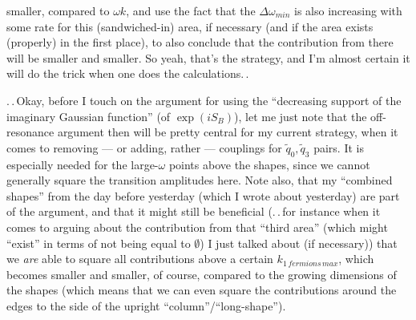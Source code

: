 \documentclass{report}
\begin{document}
smaller, compared to $\omega k$, and use the fact that the $\Delta\omega_{min}$ is also increasing with some rate for this (sandwiched-in) area, if necessary (and if the area exists (properly) in the first place), to also conclude that the contribution from there will be smaller and smaller. So yeah, that's the strategy, and I'm almost certain it will do the trick when one does the calculations.\,. 

.\,.\,Okay, before I touch on the argument for using the ``decreasing support of the imaginary Gaussian function'' (of $\exp(i S_B)$), let me just note that the off-resonance argument then will be pretty central for my current strategy, when it comes to removing --- or adding, rather --- couplings for $\tilde q_0, \tilde q_3$ pairs. It is especially needed for the large-$\omega$ points above the shapes, since we cannot generally square the transition amplitudes here. Note also, that my ``combined shapes'' from the day before yesterday (which I wrote about yesterday) are part of the argument, and that it might still be beneficial (.\,.\,for instance when it comes to arguing about the contribution from that ``third area'' (which might ``exist'' in terms of not being equal to $\emptyset$) I just talked about (if necessary)) that we \emph{are} able to square all contributions above a certain $k_{1\, fermions\, max}$, which becomes smaller and smaller, of course, compared to the growing dimensions of the shapes (which means that we can even square the contributions around the edges to the side of the upright ``column''/``long-shape''). 
\end{document}
